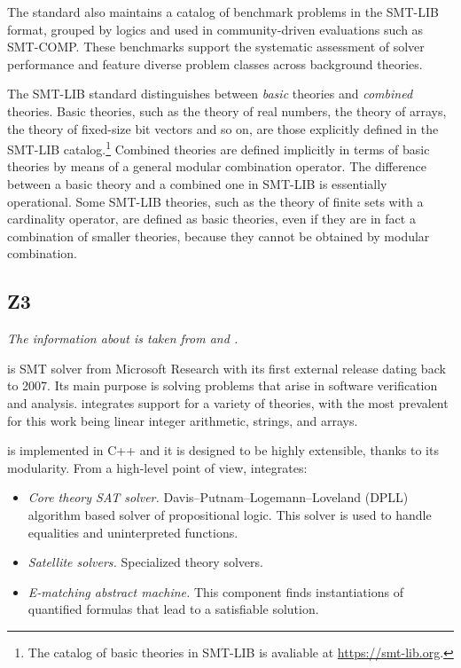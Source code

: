 The standard also maintains a catalog of benchmark problems in the SMT-LIB format, grouped by logics and used in community-driven evaluations such as SMT-COMP.
These benchmarks support the systematic assessment of solver performance and feature diverse problem classes across background theories.

The SMT-LIB standard distinguishes between \emph{basic} theories and \emph{combined} theories.
Basic theories, such as the theory of real numbers, the theory of arrays, the theory of fixed-size bit vectors and so on, are those explicitly defined in the SMT-LIB catalog.\footnote{The catalog of basic theories in SMT-LIB is avaliable at \url{https://smt-lib.org}.}
Combined theories are defined implicitly in terms of basic theories by means of a general modular combination operator.
The difference between a basic theory and a combined one in SMT-LIB is essentially operational.
Some SMT-LIB theories, such as the theory of finite sets with a cardinality operator, are defined as basic theories, even if they are in fact a combination of smaller theories, because they cannot be obtained by modular combination.


\subsection{Z3}

\textit{The information about \ziii is taken from \cite{z3} and \cite{z3:web}.}

\ziii is SMT solver from Microsoft Research with its first external release dating back to 2007.
Its main purpose is solving problems that arise in software verification and analysis.
\ziii integrates support for a variety of theories, with the most prevalent for this work being linear integer arithmetic, strings, and arrays.

\ziii is implemented in C++ and it is designed to be highly extensible, thanks to its
modularity. From a high-level point of view, \ziii integrates:
\begin{itemize}
    \item 
        \emph{Core theory SAT solver.} Davis–Putnam–Logemann–Loveland (DPLL) algorithm based solver of propositional logic. 
        This solver is used to handle equalities and uninterpreted functions.
    \item 
        \emph{Satellite solvers.}
        Specialized theory solvers.
    \item 
        \emph{E-matching abstract machine.}
        This component finds instantiations of quantified formulas that lead to a satisfiable solution.
\end{itemize}

